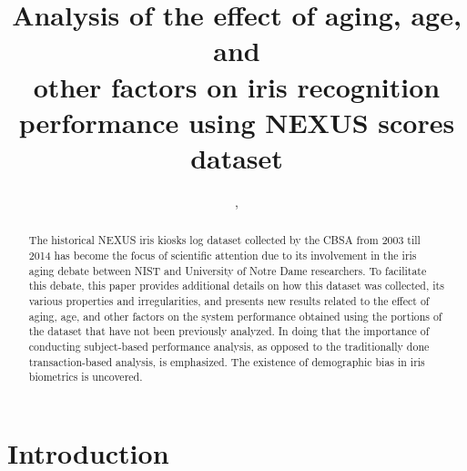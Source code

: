 \documentclass{cta-author}%
\begin{document}


\title{Analysis of
the effect of aging, age, and \\other factors on iris recognition performance 
using  NEXUS scores dataset 
}


\author{,   }

\address{%
}




\begin{abstract}
The historical NEXUS iris kiosks log dataset collected by the CBSA  from 2003 till 2014
has become the focus of scientific attention   due  to its involvement in the iris aging debate between  NIST and University of Notre Dame researchers. %
To facilitate this debate, this paper provides additional details on how this dataset was collected, its various properties and irregularities, and presents new results related to the effect of  aging, age, and other factors on the system performance
obtained using the portions of the dataset that have not been previously analyzed.
In doing that the importance of conducting subject-based performance analysis, as opposed to the traditionally done transaction-based analysis, is emphasized. 
The existence of demographic bias in iris biometrics is uncovered.
\end{abstract}



\maketitle



\section{Introduction}
\end{document}
